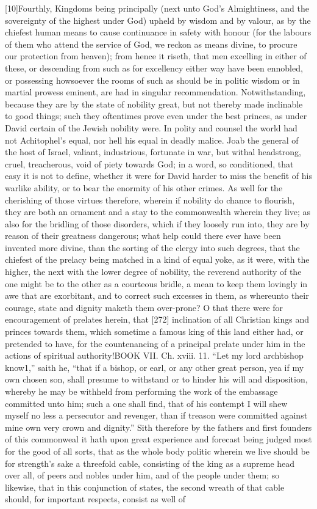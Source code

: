 [10]Fourthly, Kingdoms being principally (next unto God’s Almightiness, and the sovereignty of the highest under God) upheld by wisdom and by valour, as by the chiefest human means to cause continuance in safety with honour (for the labours of them who attend the service of God, we reckon as means divine, to procure our protection from heaven); from hence it riseth, that men excelling in either of these, or descending from such as for excellency either way have been ennobled, or possessing howsoever the rooms of such as should be in politic wisdom or in martial prowess eminent, are had in singular recommendation. Notwithstanding, because they are by the state of nobility great, but not thereby made inclinable to good things; such they oftentimes prove even under the best princes, as under David certain of the Jewish nobility were. In polity and counsel the world had not Achitophel’s equal, nor hell his equal in deadly malice. Joab the general of the host of Israel, valiant, industrious, fortunate in war, but withal headstrong, cruel, treacherous, void of piety towards God; in a word, so conditioned, that easy it is not to define, whether it were for David harder to miss the benefit of his warlike ability, or to bear the enormity of his other crimes. As well for the cherishing of those virtues therefore, wherein if nobility do chance to flourish, they are both an ornament and a stay to the commonwealth wherein they live; as also for the bridling of those disorders, which if they loosely run into, they are by reason of their greatness dangerous; what help could there ever have been invented more divine, than the sorting of the clergy into such degrees, that the chiefest of the prelacy being matched in a kind of equal yoke, as it were, with the higher, the next with the lower degree of nobility, the reverend authority of the one might be to the other as a courteous bridle, a mean to keep them lovingly in awe that are exorbitant, and to correct such excesses in them, as whereunto their courage, state and dignity maketh them over-prone? O that there were for encouragement of prelates herein, that [272] inclination of all Christian kings and princes towards them, which sometime a famous king of this land either had, or pretended to have, for the countenancing of a principal prelate under him in the actions of spiritual authority!BOOK VII. Ch. xviii. 11. “Let my lord archbishop know1,” saith he, “that if a bishop, or earl, or any other great person, yea if my own chosen son, shall presume to withstand or to hinder his will and disposition, whereby he may be withheld from performing the work of the embassage committed unto him; such a one shall find, that of his contempt I will shew myself no less a persecutor and revenger, than if treason were committed against mine own very crown and dignity.” Sith therefore by the fathers and first founders of this commonweal it hath upon great experience and forecast being judged most for the good of all sorts, that as the whole body politic wherein we live should be for strength’s sake a threefold cable, consisting of the king as a supreme head over all, of peers and nobles under him, and of the people under them; so likewise, that in this conjunction of states, the second wreath of that cable should, for important respects, consist as well of 